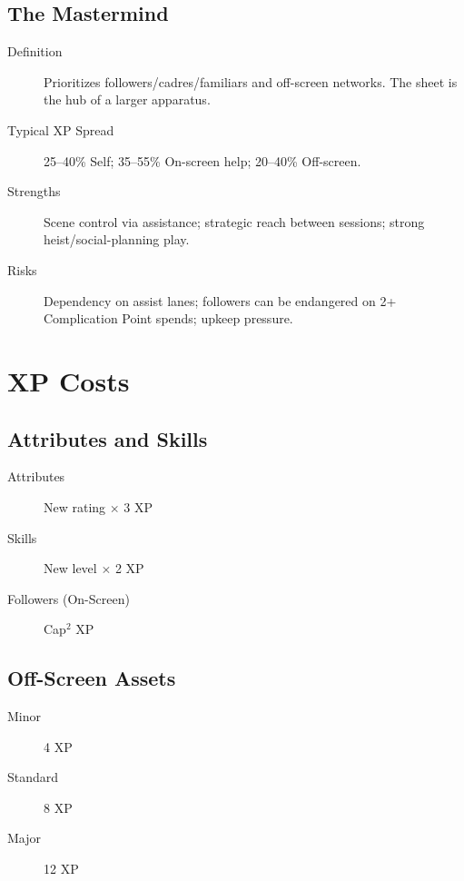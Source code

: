 \subsection{The Mastermind}

\begin{description}
\item[Definition] Prioritizes followers/cadres/familiars and off-screen networks. The sheet is the hub of a larger apparatus.
\item[Typical XP Spread] 25--40\% Self; 35--55\% On-screen help; 20--40\% Off-screen.
\item[Strengths] Scene control via assistance; strategic reach between sessions; strong heist/social-planning play.
\item[Risks] Dependency on assist lanes; followers can be endangered on 2+ Complication Point spends; upkeep pressure.
\end{description}

\section{XP Costs}

\subsection{Attributes and Skills}

\begin{description}
\item[Attributes] New rating $\times$ 3 XP
\item[Skills] New level $\times$ 2 XP
\item[Followers (On-Screen)] Cap$^2$ XP
\end{description}

\subsection{Off-Screen Assets}

\begin{description}
\item[Minor] 4 XP
\item[Standard] 8 XP
\item[Major] 12 XP
\end{description}

